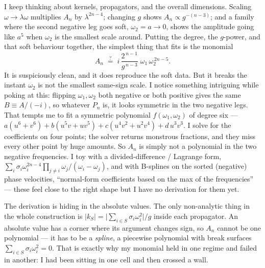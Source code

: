 \documentclass{article}
\begin{document}
I keep thinking about kernels, propagators, and the overall dimensions. Scaling
$\omega\to\lambda\omega$ multiplies $A_n$ by $\lambda^{2n-4}$; changing $g$ shows
$A_n\propto g^{-(n-3)}$; and a family where the second negative leg goes soft,
$\omega_2=a\to0$, shows the amplitude going like $a^5$ when $\omega_2$ is the
smallest scale around. Putting the degree, the $g$-power, and that soft behaviour
together, the simplest thing that fits is the monomial
\[
A_n \;\stackrel{?}{=}\; i\,\frac{2^{\,n-1}}{g^{\,n-3}}\;\omega_1\,\omega_2^{\,2n-5}.
\]
It is suspiciously clean, and it does reproduce the soft data. But it breaks the
instant $\omega_2$ is not the smallest same-sign scale. I notice something
intriguing while poking at this: flipping $\omega_1,\omega_2$ both negative or
both positive gives the same $B\equiv A/(-i)$, so whatever $P_n$ is, it looks
symmetric in the two negative legs. That tempts me to fit a symmetric polynomial
$f(\omega_1,\omega_2)$ of degree six --- $a(u^6{+}v^6)+b(u^5v{+}uv^5)+
c(u^4v^2{+}u^2v^4)+d\,u^3v^3$. I solve for the coefficients on four points; the
solver returns monstrous fractions, and they miss every other point by huge
amounts. So $A_n$ is simply not a polynomial in the two negative frequencies. I
toy with a divided-difference / Lagrange form,
$\sum_i\sigma_i\omega_i^{2n-4}\prod_{j\ne i}\omega_j/(\omega_i-\omega_j)$, and
with B-splines on the sorted (negative) phase velocities, ``normal-form
coefficients based on the max of the frequencies'' --- these feel close to the
right shape but I have no derivation for them yet.

The derivation is hiding in the absolute values. The only non-analytic thing in
the whole construction is $|k_S|=\big|\sum_{i\in S}\sigma_i\omega_i^2\big|/g$
inside each propagator. An absolute value has a corner where its argument changes
sign, so $A_n$ cannot be one polynomial --- it has to be a \emph{spline}, a
piecewise polynomial with break surfaces $\sum_{i\in S}\sigma_i\omega_i^2=0$. That
is exactly why my monomial held in one regime and failed in another: I had been
sitting in one cell and then crossed a wall.
\end{document}
